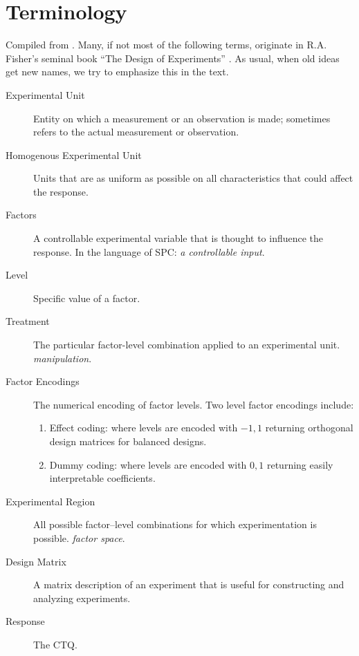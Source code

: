 \section{Terminology}
Compiled from \cite{mason_statistical_2003}. Many, if not most of the following terms, originate in R.A. Fisher's seminal book ``The Design of Experiments'' \citep{fisher_design_1960}. As usual, when old ideas get new names, we try to emphasize this in the text.



\begin{description}

\item [Experimental Unit]  Entity on which a measurement or an observation is made;
sometimes refers to the actual measurement or observation.
\item [Homogenous Experimental Unit] Units that are as uniform as possible on all characteristics that could affect the response.

\item [Factors]  A controllable experimental variable that is thought to influence the response. In the language of SPC: \emph{a controllable input}.

\item [Level] Specific value of a factor.

\item[Treatment] The particular factor-level combination applied to an experimental unit. \Aka \emph{manipulation}.

\item [Factor Encodings] The numerical encoding of factor levels.
Two level factor encodings include:
\begin{enumerate}
\item Effect coding: where levels are encoded with $-1,1$ returning orthogonal design matrices for balanced designs.
\item Dummy coding: where levels are encoded with $0,1$ returning easily interpretable coefficients.
\end{enumerate}

\item [Experimental Region] All possible factor–level combinations for which experimentation is possible. \Aka \emph{factor space}.

\item [Design Matrix] A matrix description of an experiment that is useful for constructing and analyzing experiments.

\item [Response] The CTQ.


\end{description}
